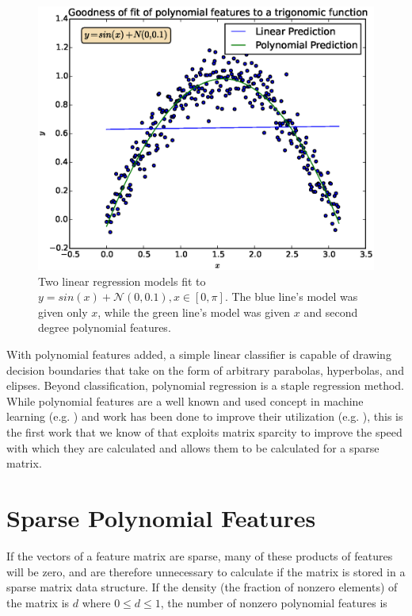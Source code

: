 \documentclass[11pt,twocolumn]{article}
\begin{document}
\begin{figure}
    \centering
    \includegraphics[scale=0.4]{regression.eps}
     \caption{\footnotesize{Two linear regression models fit to $y=sin(x) + \mathcal{N}(0, 0.1), x \in [0, \pi]$. The blue line's model was given only $x$, while the green line's model was given $x$ and second degree polynomial features.}}
    \label{fig:regression}
\end{figure}


With polynomial features added, a simple linear classifier is capable of drawing decision boundaries
that take on the form of arbitrary parabolas, hyperbolas, and elipses. Beyond classification, polynomial regression \cite{theoryoflinearmodels} is a staple regression method.
While polynomial features are a well known and used concept in machine learning (e.g. \cite{pavlidis2002learning, konidaris2009skill, wiesler2009investigations}) and work has been done to improve their utilization (e.g. \cite{pevckov2008minimal, huang2010predicting}), this is the first work that we know of that exploits matrix sparcity 
to improve the speed with which they are calculated and allows them to be calculated for a sparse matrix.


\section{Sparse Polynomial Features} \label{sec:sparse}
If the vectors of a feature matrix are sparse, many of these products of features will be
zero, and are therefore unnecessary to calculate if the matrix is stored in a sparse matrix 
data structure. If the density (the fraction of nonzero elements) of the matrix is $d$ where $0 \le d \le 1$,
the number of nonzero polynomial features is
\end{document}
